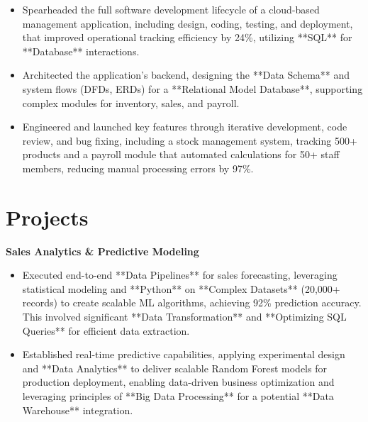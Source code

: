 \documentclass[a4paper,10pt]{article}
\begin{document}
\begin{itemize}[leftmargin=*, itemsep=0pt, parsep=1pt] %
\vspace{-7mm}
    \item Spearheaded the full software development lifecycle of a cloud-based management application, including design, coding, testing, and deployment, that improved operational tracking efficiency by 24\%, utilizing **SQL** for **Database** interactions.
\item Architected the application's backend, designing the **Data Schema** and system flows (DFDs, ERDs) for a **Relational Model Database**, supporting complex modules for inventory, sales, and payroll.
\item Engineered and launched key features through iterative development, code review, and bug fixing, including a stock management system, tracking 500+ products and a payroll module that automated calculations for 50+ staff members, reducing manual processing errors by 97\%. 

\end{itemize}

\vspace{-4mm}

\section*{Projects}
\textbf{Sales Analytics & Predictive Modeling} \\
\begin{itemize}[leftmargin=*, itemsep=0pt, parsep=1pt]
\vspace{-7mm}
    \item Executed end-to-end **Data Pipelines** for sales forecasting, leveraging statistical modeling and **Python** on **Complex Datasets** (20,000+ records) to create scalable ML algorithms, achieving 92\% prediction accuracy. This involved significant **Data Transformation** and **Optimizing SQL Queries** for efficient data extraction.
    \item Established real-time predictive capabilities, applying experimental design and **Data Analytics** to deliver scalable Random Forest models for production deployment, enabling data-driven business optimization and leveraging principles of **Big Data Processing** for a potential **Data Warehouse** integration.
    \end{itemize}
\end{document}
